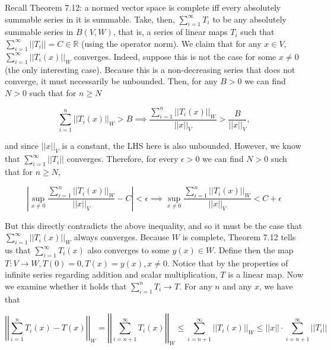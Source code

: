 \begin{solution}
    
    Recall Theorem 7.12: a normed vector space is complete iff every absolutely summable series in it is summable.
    Take, then, $\sum_{i=1}^{\infty} T_i$ to be any absolutely summable series in $B(V, W)$, that is, a series of linear maps $T_i$ such that $\sum_{i=1}^{\infty} \lvert \lvert T_i \rvert \rvert = C \in \mathbb{R}$ (using the operator norm).
    We claim that for any $x \in V$, $\sum_{i=1}^{\infty} \lvert \lvert T_i(x) \rvert \rvert_W$ converges.
    Indeed, suppose this is not the case for some $x \neq 0$ (the only interesting case).
    Because this is a non-decreasing series that does not converge, it must necessarily be unbounded.
    Then, for any $B > 0$ we can find $N > 0$ such that for $n \geq N$

    \[\sum_{i=1}^{n} \lvert \lvert T_i(x) \rvert \rvert_W > B \implies \frac{\sum_{i=1}^{n} \lvert \lvert T_i(x) \rvert \rvert_W}{\lvert \lvert x \rvert \rvert_V} > \frac{B}{\lvert \lvert x \rvert \rvert_V},\]

    and since $\lvert \lvert x \rvert \rvert_V$ is a constant, the LHS here is also unbounded.
    However, we know that $\sum_{i=1}^{\infty} \lvert \lvert T_i \rvert \rvert$ converges.
    Therefore, for every $\epsilon > 0$ we can find $N > 0$ such that for $n \geq N$,

    \[\left\vert \sup_{x \neq 0} \frac{\sum_{i=1}^{n}\lvert \lvert T_i(x) \rvert \rvert_W}{\lvert \lvert x \rvert \rvert_V} - C \right\vert < \epsilon \implies \sup_{x \neq 0}\frac{\sum_{i=1}^{n} \lvert \lvert T_i(x) \rvert \rvert_W}{\lvert \lvert x \rvert \rvert_V} < C + \epsilon\]

    But this directly contradicts the above inequality, and so it must be the case that $\sum_{i=1}^{\infty} \lvert \lvert T_i(x) \rvert \rvert_W$ always converges.
    Because $W$ is complete, Theorem 7.12 tells us that $\sum_{i=1}^{\infty} T_i(x)$ also converges to some $y(x) \in W$.
    Define then the map $T: V \rightarrow W, T(0) = 0, T(x) = y(x), x \neq 0$.
    Notice that by the properties of infinite series regarding addition and scalar multiplication, $T$ is a linear map.
    Now we examine whether it holds that $\sum_{i=1}^{n} T_i \rightarrow T$.
    For any $n$ and any $x$, we have that

    \[\left\vert \left\vert \sum_{i=1}^{n} T_i(x) - T(x) \right\vert \right\vert_W = \left\vert \left\vert \sum_{i=n + 1}^{\infty} T_i(x) \right\vert \right\vert_W \leq \sum_{i = n + 1}^{\infty} \lvert \lvert T_i(x) \rvert \rvert_W \leq \lvert \lvert x \rvert \rvert \cdot \sum_{i=n + 1}^{\infty} \lvert \lvert T_i \rvert \rvert\]


\end{solution}
